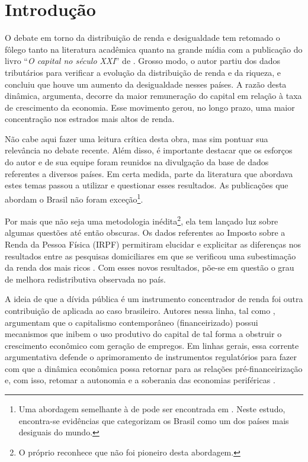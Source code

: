 \section{Introdução}\label{Intro}

O debate em torno da distribuição de renda e desigualdade tem retomado o fôlego tanto na literatura acadêmica quanto na grande mídia com a publicação do livro ``\textit{O capital no século XXI}'' de \textcite{piketty_o_2014}. 
Grosso modo, o autor partiu dos dados tributários para verificar a evolução da distribuição de renda e da riqueza, e concluiu que houve um aumento da desigualdade nesses países. A razão desta dinâmica, argumenta, decorre da maior remuneração do capital em relação à taxa de crescimento da economia. Esse movimento gerou, no longo prazo, uma maior concentração nos estrados mais altos de renda.

Não cabe aqui fazer uma leitura crítica desta obra, mas sim pontuar sua relevância no debate recente. Além disso, é importante destacar que os esforços do autor e de sua equipe foram reunidos na divulgação da base de dados referentes a diversos países. %
Em certa medida, parte da literatura que abordava estes temas passou a utilizar e questionar esses resultados. As publicações que abordam o Brasil não foram exceção\footnote{Uma abordagem semelhante à de \textcite{piketty_o_2014} pode ser encontrada em \textcite{mila_income_2015}. Neste estudo, encontra-se evidências que categorizam os Brasil como um dos países mais desiguais do mundo.}.

Por mais que não seja uma metodologia inédita\footnote{O próprio \textcite{piketty_o_2014} reconhece que não foi pioneiro desta abordagem.}, ela tem lançado luz sobre algumas questões até então obscuras. Os dados referentes ao Imposto sobre a Renda da Pessoa Física (IRPF) permitiram elucidar e explicitar as diferenças nos resultados entre as pesquisas domiciliares em que se verificou uma subestimação da renda dos mais ricos \cites{afonso_irpf_2014}{medeiros_upper_2015}. Com esses novos resultados, põe-se em questão o grau de melhora redistributiva observada no país.

A ideia de que a dívida pública é um instrumento concentrador de renda foi outra contribuição de \textcite{piketty_o_2014} aplicada ao caso brasileiro. Autores nessa linha, tal como \textcite{dowbor_era_2017}, argumentam que o capitalismo contemporâneo (financeirizado) possui mecanismos que inibem o uso produtivo do capital de tal forma a obstruir o crescimento econômico com geração de empregos. 
Em linhas gerais, essa corrente argumentativa defende o aprimoramento de instrumentos regulatórios para fazer com que a dinâmica econômica possa retornar para as relações pré-financeirização e, com isso, retomar a autonomia e a soberania  das economias periféricas \cite{paulani_nao_2017}.

